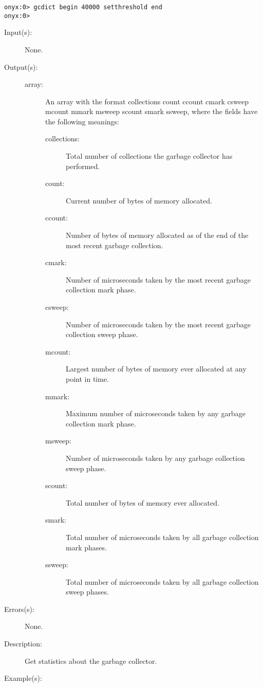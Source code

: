 \begin{description}
\begin{description}
\begin{verbatim}
onyx:0> gcdict begin 40000 setthreshold end
onyx:0>
		\end{verbatim}
	\end{description}
\label{gcdict:stats}
\item[{\onyxop{--}{stats}{array}}: ]
	\begin{description}\item[]
	\item[Input(s): ] None.
	\item[Output(s): ]
		\begin{description}\item[]
		\item[array: ]
			An array with the format {\lb}collections count
			{\lb}ccount cmark csweep{\rb} {\lb}mcount mmark
			msweep{\rb} {\lb}scount smark ssweep{\rb}{\rb}, where
			the fields have the following meanings:
			\begin{description}%
			\item[collections: ]
				Total number of collections the garbage
				collector has performed.
			\item[count: ]
				Current number of bytes of memory allocated.
			\item[ccount: ]
				Number of bytes of memory allocated as of the
				end of the most recent garbage collection.
			\item[cmark: ]
				Number of microseconds taken by the most recent
				garbage collection mark phase.
			\item[csweep: ]
				Number of microseconds taken by the most recent
				garbage collection sweep phase.
			\item[mcount: ]
				Largest number of bytes of memory ever allocated
				at any point in time.
			\item[mmark: ]
				Maximum number of microseconds taken by any
				garbage collection mark phase.
			\item[msweep: ]
				Number of microseconds taken by any garbage
				collection sweep phase.
			\item[scount: ]
				Total number of bytes of memory ever allocated.
			\item[smark: ]
				Total number of microseconds taken by all
				garbage collection mark phases.
			\item[ssweep: ]
				Total number of microseconds taken by all
				garbage collection sweep phases.
			\end{description}
		\end{description}
	\item[Errors(s): ] None.
	\item[Description: ]
		Get statistics about the garbage collector.
	\item[Example(s): ]\begin{verbatim}


\end{verbatim}
\end{description}
\end{description}
